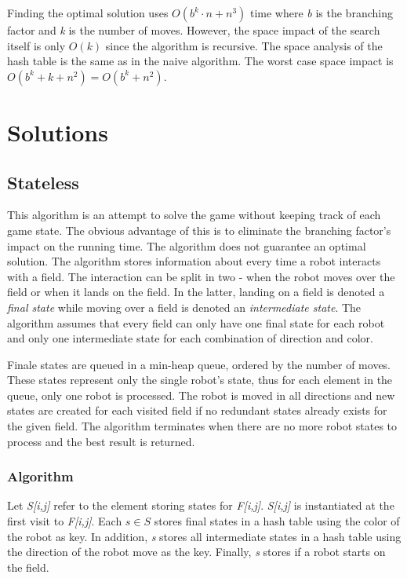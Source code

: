 \documentclass[]{article}
\begin{document}
Finding the optimal solution uses \(O(b^k \cdot n + n^3)\) time where
\emph{b} is the branching factor and \emph{k} is the number of moves.
However, the space impact of the search itself is only \(O(k)\) since
the algorithm is recursive. The space analysis of the hash table is the
same as in the naive algorithm. The worst case space impact is
\(O(b^k+k+n^2) = O(b^k+n^2)\).

\section{Solutions}\label{solutions}

\subsection{Stateless}\label{stateless}

This algorithm is an attempt to solve the game without keeping track of
each game state. The obvious advantage of this is to eliminate the
branching factor's impact on the running time. The algorithm does not
guarantee an optimal solution. The algorithm stores information about
every time a robot interacts with a field. The interaction can be split
in two - when the robot moves over the field or when it lands on the
field. In the latter, landing on a field is denoted a \emph{final state}
while moving over a field is denoted an \emph{intermediate state}. The
algorithm assumes that every field can only have one final state for
each robot and only one intermediate state for each combination of
direction and color.

Finale states are queued in a min-heap queue, ordered by the number of
moves. These states represent only the single robot's state, thus for
each element in the queue, only one robot is processed. The robot is
moved in all directions and new states are created for each visited
field if no redundant states already exists for the given field. The
algorithm terminates when there are no more robot states to process and
the best result is returned.

\subsubsection{Algorithm}\label{algorithm}

Let \emph{S{[}i,j{]}} refer to the element storing states for
\emph{F{[}i,j{]}}. \emph{S{[}i,j{]}} is instantiated at the first visit
to \emph{F{[}i,j{]}}. Each \(s \in S\) stores final states in a hash
table using the color of the robot as key. In addition, \emph{s} stores
all intermediate states in a hash table using the direction of the robot
move as the key. Finally, \emph{s} stores if a robot starts on the
field.
\end{document}
